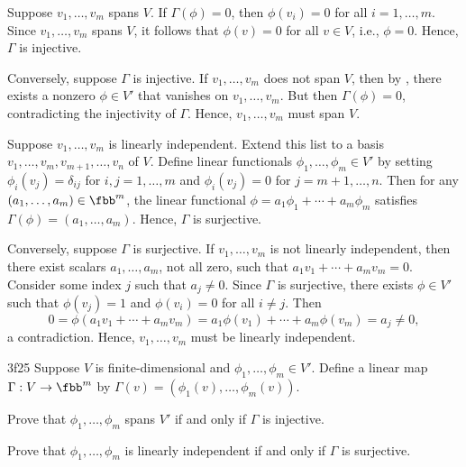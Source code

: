 \begin{solenum}
    \item Suppose $v_1, \ldots, v_m$ spans $V$.
	If $\Gamma(\phi) = 0$, then $\phi(v_i) = 0$ for all $i = 1, \ldots, m$.
	Since $v_1, \ldots, v_m$ spans $V$, it follows that $\phi(v) = 0$ for all $v \in V$, i.e., $\phi = 0$.
	Hence, $\Gamma$ is injective.
    
    Conversely, suppose $\Gamma$ is injective.
	If $v_1, \ldots, v_m$ does not span $V$, then by , there exists a nonzero $\phi \in V'$ that vanishes on $v_1, \ldots, v_m$.
	But then $\Gamma(\phi) = 0$, contradicting the injectivity of $\Gamma$.
	Hence, $v_1, \ldots, v_m$ must span $V$.
    \item Suppose $v_1, \ldots, v_m$ is linearly independent.
	Extend this list to a basis $v_1, \ldots, v_m, v_{m + 1}, \ldots, v_n$ of $V$.
	Define linear functionals $\phi_1, \ldots, \phi_m \in V'$ by setting $\phi_i(v_j) = \delta_{ij}$ for $i, j = 1, \ldots, m$ and $\phi_i(v_j) = 0$ for $j = m + 1, \ldots, n$.
	Then for any $(a_1, \ldots, a_m) \in \fbb^m$, the linear functional $\phi = a_1 \phi_1 + \cdots + a_m \phi_m$ satisfies $\Gamma(\phi) = (a_1, \ldots, a_m)$.
	Hence, $\Gamma$ is surjective.
    
    Conversely, suppose $\Gamma$ is surjective.
	If $v_1, \ldots, v_m$ is not linearly independent, then there exist scalars $a_1, \ldots, a_m$, not all zero, such that $a_1 v_1 + \cdots + a_m v_m = 0$.
	Consider some index $j$ such that $a_j \neq 0$.
	Since $\Gamma$ is surjective, there exists $\phi \in V'$ such that $\phi(v_j) = 1$ and $\phi(v_i) = 0$ for all $i \neq j$.
	Then
    \[
    	0 = \phi(a_1 v_1 + \cdots + a_m v_m) = a_1 \phi(v_1) + \cdots + a_m \phi(v_m) = a_j \neq 0,
    \]
    a contradiction.
	Hence, $v_1, \ldots, v_m$ must be linearly independent.
\end{solenum}

\begin{exercise}{3f25}
    Suppose $V$ is finite-dimensional and $\phi_1, \ldots, \phi_m \in V'$.
	Define a linear map $\Gamma: V \to \fbb^m$ by $\Gamma(v) = (\phi_1(v), \ldots, \phi_m(v))$.
    \begin{subexercises}
        \item Prove that $\phi_1, \ldots, \phi_m$ spans $V'$ if and only if $\Gamma$ is injective.
        \item Prove that $\phi_1, \ldots, \phi_m$ is linearly independent if and only if $\Gamma$ is surjective.
    \end{subexercises}
\end{exercise}

